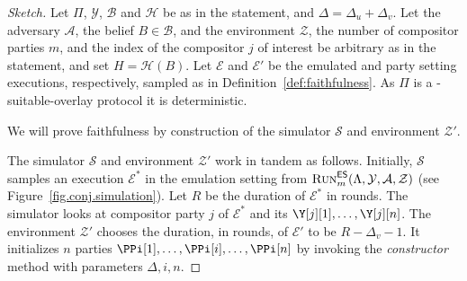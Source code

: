 \begin{proof}[Sketch]
  Let $\Pi$, $\mathcal{Y}$, $\mathcal{B}$ and $\mathcal{H}$
  be as in the statement, and $\Delta = \Delta_u + \Delta_v$.
  Let the adversary $\mathcal{A}$, the belief $B \in \mathcal{B}$,
  and the environment $\mathcal{Z}$, the number of compositor parties $m$,
  and the index of the compositor $j$ of interest be arbitrary
  as in the statement, and set $H = \mathcal{H}(B)$.
  Let $\mathcal{E}$ and $\mathcal{E}'$ be the emulated and party setting
  executions, respectively, sampled as in Definition~\ref{def:faithfulness}.
  As $\Pi$ is a \rollerblade-suitable-overlay protocol it is deterministic.

  We will prove faithfulness by
  construction of the simulator $\mathcal{S}$ and environment $\mathcal{Z}'$.

  The simulator $\mathcal{S}$ and environment $\mathcal{Z}'$ work in tandem
  as follows.
  Initially, $\mathcal{S}$ samples an execution
  $\mathcal{E}^*$ in the emulation setting from
  $\textsc{Run}^{\textsf{ES}}_m(\Lambda,\allowbreak\mathcal{Y},\allowbreak\mathcal{A},\allowbreak\mathcal{Z})$
  (see Figure~\ref{fig.conj.simulation}).
  Let $R$ be the duration of $\mathcal{E}^*$ in rounds.
  The simulator looks at compositor party $j$ of $\mathcal{E}^*$
  and its $\Y[j][1], \ldots, \Y[j][n]$.
  The environment $\mathcal{Z}'$ chooses the duration, in rounds, of
  $\mathcal{E}'$ to be $R - \Delta_v - 1$. It initializes $n$
  parties $\PPi[1], \ldots, \PPi[i], \ldots, \PPi[n]$ by invoking
  the \emph{constructor} method with parameters $\Delta, i, n$.


\end{proof}
